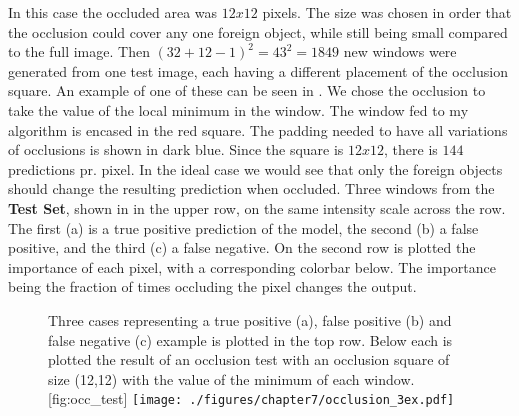 In this case the occluded area was $12x12$ pixels. 
The size was chosen in order that the occlusion could cover any one foreign object, while still being small compared to the full image.
Then $(32+12-1)^2=43^2 = 1849$ new windows were generated from one test image, each having a different placement of the occlusion square. An example of one of these can be seen in . We chose the occlusion to take the value of the local minimum in the window. The window fed to my algorithm is encased in the red square.
The padding needed to have all variations of occlusions is shown in dark blue.
Since the square is $12x12$, there is $144$ predictions pr. pixel.
In the ideal case we would see that only the foreign objects should change the resulting prediction when occluded.
Three windows from the \textbf{Test Set}, shown in  in the upper row, on the same intensity scale across the row. 
The first (a) is a true positive prediction of the model, the second (b) a false positive, and the third (c) a false negative. 
On the second row is plotted the importance of each pixel, with a corresponding colorbar below. The importance being the fraction of times occluding the pixel changes the output.

\begin{figure}[h]
	\begin{sidecaption}{\antimpjustification Three cases representing a true positive (a), false positive (b) and false negative (c) example  is plotted in the top row. Below each is plotted the result of an occlusion test with an occlusion square of size (12,12) with the value of the minimum of each window.}[fig:occ_test]
		\antimpjustification
		\centering
		\texttt{[image: ./figures/chapter7/occlusion\_3ex.pdf]}
	\end{sidecaption}
\end{figure}

